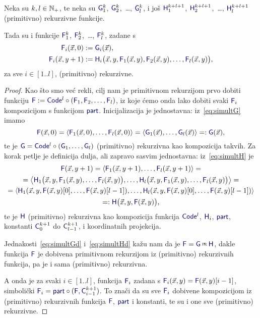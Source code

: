 \begin{propozicija}\label{prop:simultrek}
Neka su $k,l\in{\mathbb N}_+$, te neka su $\f G_1^k$, $\f G_2^k$,~\ldots, $\f G_l^k$, i još $\f H_1^{k+l+1}$, $\f H_2^{k+l+1}$,~\ldots, $\f H_l^{k+l+1}$ (primitivno) rekurzivne funkcije.

Tada su i funkcije $\f F_1^k$, $\f F_2^k$,~\ldots, $\f F_l^k$, zadane s
\begin{align}
    \label{eq:simultG}\f F_i(\vec x,0)&:=\f G_i(\vec x)\text,\\
    \label{eq:simultH}
    \f F_i(\vec x,y+1)&:=\f H_i\bigl(\vec x,y,\f F_1(\vec x,y),\f F_2(\vec x,y),\dotsc,\f F_l(\vec x,y)\bigr)\text,
\end{align}
za sve $i\in[1..l]$, (primitivno) rekurzivne.
\end{propozicija}
\begin{proof}
Kao što smo već rekli, cilj nam je primitivnom rekurzijom prvo dobiti funkciju $\f F:=\f{Code}^l\circ(\f F_1,\f F_2,\dotsc,\f F_l)$, iz koje ćemo onda lako dobiti svaki $\f F_i$ kompozicijom s funkcijom $\f{part}$. Inicijalizacija je jednostavna: iz~\eqref{eq:simultG} imamo
\begin{equation}\label{eq:simultGd}
    \f F(\vec x,0)=\langle \f F_1(\vec x,0),\dotsc,\f F_l(\vec x,0)\rangle=\langle \f G_1(\vec x),\dotsc,\f G_l(\vec x)\rangle=:\f G(\vec x)\text,
\end{equation}
te je $\f G=\f{Code}^l\circ(\f G_1,\dotsc,\f G_l)$ (primitivno) rekurzivna kao kompozicija takvih. Za korak petlje je definicija dulja, ali zapravo sasvim jednostavna: iz~\eqref{eq:simultH} je
\begin{multline}\label{eq:simultHd}
\f F(\vec x,y+1)=\langle\f F_1(\vec x,y+1),\dotsc,\f F_l(\vec x,y+1)\rangle=\\
=\bigl\langle\f H_1\bigl(\vec x,y,\f F_1(\vec x,y),\dotsc,\f F_l(\vec x,y)\bigr),\dotsc,\f H_l\bigl(\vec x,y,\f F_1(\vec x,y),\dotsc,\f F_l(\vec x,y)\bigr)\bigr\rangle=\\
=\langle
\f H_1(\vec x,y,
\f F(\vec x,y)[0],
\dotsc,
\f F(\vec x,y)[l-1]),
\dotsc,
\f H_l(\vec x,y,
\f F(\vec x,y)[0],
\dotsc,
\f F(\vec x,y)[l-1])\rangle\\
=:\f H\bigl(\vec x,y,\f F(\vec x,y)\bigr)\text,
\end{multline}
te je $\f H$ (primitivno) rekurzivna kao kompozicija funkcija $\f{Code}^l$, $\f H_i$, $\f{part}$, konstanti $\f C_0^{k+1}$ do $\f C_{l-1}^{k+1}$, i koordinatnih projekcija.

Jednakosti~\eqref{eq:simultGd} i~\eqref{eq:simultHd} kažu nam da je $\f F=\f G\pr\f H$, dakle funkcija $\f F$ je dobivena primitivnom rekurzijom iz (primitivno) rekurzivnih funkcija, pa je i sama (primitivno) rekurzivna. 

A onda je za svaki $i\in[1..l]$, funkcija $\f F_i$ zadana s $\f F_i(\vec x, y)=\f F(\vec x,y)[i-1]$, simbolički $\f F_i=\f{part}\circ(\f F,\f C_{i-1}^{k+1})$. To znači da su sve $\f F_i$ dobivene kompozicijom iz (primitivno) rekurzivnih funkcija $\f F$, $\f{part}$ i konstanti, te su i one sve (primitivno) rekurzivne.
\end{proof}

